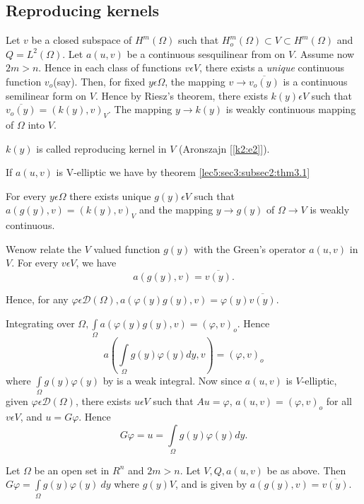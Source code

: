 \subsection{Reproducing kernels}\label{lec8:sec4:subsec3}

Let $v$ be a closed subspace of $H^m (\Omega)$ such that $H^m_o
(\Omega) \subset V \subset H^m (\Omega)$ and $Q = L^2 (\Omega)$. Let
$a (u , v)$ be a continuous sesquilinear from on $V$. Assume now
\textit{$2m > n$}. Hence in each class of functions $v \epsilon V$,
there exists a \textit{unique} continuous function $v_o $(say). Then,
for fixed $y \epsilon \Omega$, the mapping $v \to \overline{v_o
  (y)}$ is a continuous semilinear form on $V$. Hence by Riesz's
theorem, there exists $k (y) \epsilon V$ such that $\overline{v_o
  (y)} = (k (y) , v)_V$. The mapping $y \to k(y)$ is weakly continuous
mapping of $\Omega$ into $V$. 

\begin{definition}\label{lec8:sec4:subsec3:def4.1}%
  $k(y)$ is called reproducing kernel in $V$ (Aronszajn [\ref{k2:e2}]). 
\end{definition}

If $a(u,v)$ is V-elliptic we have by theorem \ref{lec5:sec3:subsec2:thm3.1}

\begin{lemma}\label{lec8:sec4:subsec3:lem4.1}%
  For every $y \epsilon \Omega$ there exists unique $g (y)
  \epsilon V$ such that $a (g (y), v) = (k (y), v )_V$ and the
  mapping $y \to g(y)$ of $\Omega \to V$ is weakly continuous.  
\end{lemma}

We\pageoriginale now relate the $V$ valued function $g(y)$ with the Green's operator
$a(u,v)$ in $V$. For every $v \epsilon V$, we have  
$$
a(g (y),v) = \overline{v(y)}.
$$

Hence, for any $\varphi \epsilon \mathscr{D} (\Omega), a (\varphi
(y) g(y), v) = \varphi (y) \overline{v(y)}$. 

Integrating over $\Omega, \int\limits_{\Omega} a (\varphi (y) g(y), v)
= (\varphi, v)_o$. Hence  
$$
a \left(\int\limits_{\Omega} g(y) \varphi (y) dy, v\right)= (\varphi , v)_o
$$
where $\int\limits_{\Omega} g(y) \varphi(y)$ by is a weak
integral. Now since $a(u,v)$ is $V$-elliptic, given $\varphi
\epsilon \mathscr{D} (\Omega)$, there exists $u \epsilon V$ such
that $Au = \varphi$, $a (u,v) = (\varphi, v)_o$ for all $v \epsilon
V$, and $u = G \varphi$. Hence 
$$
G \varphi = u = \int\limits_{\Omega}g(y) \varphi (y) dy.
$$
\begin{theorem}\label{lec8:sec4:subsec3:thm4.5}%
  Let $\Omega$ be an open set in $R^n$ and  $2m > n$. Let $V, Q,
  a(u,v)$ be as above. Then $G \varphi = \int\limits_{\Omega} g(y)
  \varphi (y) ~dy$ where $g(y) V$, and is given by $a (g (y), v)=
  \overline{v(y)}$. 
\end{theorem}

